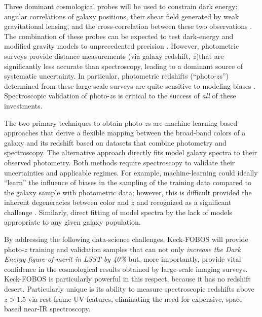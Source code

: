 \documentclass[oneside,11pt]{amsart}
\begin{document}
Three dominant cosmological probes will be used to constrain dark
energy: angular correlations of galaxy positions, their shear field
generated by weak gravitational lensing, and the cross-correlation
between these two observations \citep{2015MNRAS.451.4424K}.  The
combination of these probes can be expected to test dark-energy and
modified gravity models to unprecedented precision
\citep{2006astro.ph..9591A}.  However, photometric surveys provide
distance measurements (via galaxy redshift, $z$)that are significantly
less accurate than spectroscopy, leading to a dominant source of
systematic uncertainty.  In particular, photometric redshifts
(``photo-$z$s'') determined from these large-scale surveys
\citep{hemmati18} are quite sensitive to modeling biases
\citep{2018MNRAS.476..151E, 10.1093/mnras/sty2902}.  Spectroscopic
validation of photo-$z$s is critical to the success of {\it all} of
these investments. 



The two primary techniques to obtain photo-$z$s are
machine-learning-based approaches that derive a flexible mapping between
the broad-band colors of a galaxy and its redshift based on datasets
that combine photometry and spectroscopy.  The alternative approach
directly fits model galaxy spectra to their observed photometry.  Both
methods require spectroscopy to validate their uncertainties and
applicable regimes.  For example, machine-learning could ideally
``learn'' the influence of biases in the sampling of the training data
compared to the galaxy sample with photometric data; however, this is
difficult provided the inherent degeneracies between color and $z$ and
recognized as a significant challenge \citep[see
e.g.][]{2016PhRvD..94d2005B}.  Similarly, direct fitting of model
spectra by the lack of models appropriate to any given galaxy
population.

By addressing the following data-science challenges, Keck-FOBOS will
provide photo-$z$ training and validation samples that can not only
\emph{increase the Dark Energy figure-of-merit in LSST by 40\%}
\citep{newman15} but, more importantly, provide vital confidence in the
cosmological results obtained by large-scale imaging surveys.
Keck-FOBOS is particularly powerful in this respect, because it has no
redshift desert.  Particularly unique is its ability to measure
spectroscopic redshifts above $z > 1.5$ via rest-frame UV features,
eliminating the need for expensive, space-based near-IR spectroscopy. 
\end{document}
